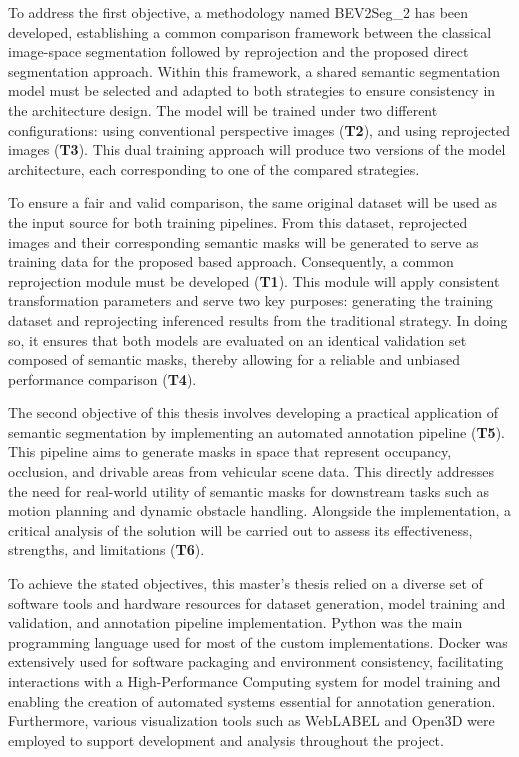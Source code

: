 To address the first objective, a methodology named BEV2Seg\_2 has been developed, establishing a common comparison framework between the classical image-space segmentation followed by  reprojection and the proposed direct  segmentation approach. Within this framework, a shared semantic segmentation model must be selected and adapted to both strategies to ensure consistency in the architecture design. The model will be trained under two different configurations: using conventional perspective images (\textbf{T2}), and using  reprojected images (\textbf{T3}). This dual training approach will produce two versions of the model architecture, each corresponding to one of the compared strategies.

To ensure a fair and valid comparison, the same original dataset will be used as the input source for both training pipelines. From this dataset,  reprojected images and their corresponding semantic masks will be generated to serve as training data for the proposed  based approach. Consequently, a common  reprojection module must be developed (\textbf{T1}). This module will apply consistent transformation parameters and serve two key purposes: generating the  training dataset and reprojecting inferenced results from the traditional strategy. In doing so, it ensures that both models are evaluated on an identical validation set composed of  semantic masks, thereby allowing for a reliable and unbiased performance comparison (\textbf{T4}).

The second objective of this thesis involves developing a practical application of  semantic segmentation by implementing an automated annotation pipeline (\textbf{T5}). This pipeline aims to generate masks in  space that represent occupancy, occlusion, and drivable areas from vehicular scene data. This directly addresses the need for real-world utility of  semantic masks for downstream tasks such as motion planning and dynamic obstacle handling. Alongside the implementation, a critical analysis of the solution will be carried out to assess its effectiveness, strengths, and limitations (\textbf{T6}).

To achieve the stated objectives, this master's thesis relied on a diverse set of software tools and hardware resources for dataset generation, model training and validation, and annotation pipeline implementation. Python was the main programming language used for most of the custom implementations. Docker was extensively used for software packaging and environment consistency, facilitating interactions with a High-Performance Computing system for model training and enabling the creation of automated systems essential for annotation generation. Furthermore, various visualization tools such as WebLABEL and Open3D were employed to support development and analysis throughout the project.

